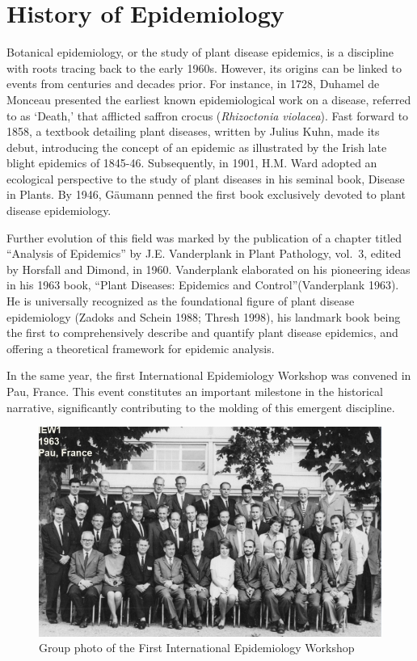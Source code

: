 \documentclass[
  letterpaper,
]{book}
\begin{document}
\hypertarget{history-of-epidemiology}{%
\section{History of Epidemiology}\label{history-of-epidemiology}}

Botanical epidemiology, or the study of plant disease epidemics, is a
discipline with roots tracing back to the early 1960s. However, its
origins can be linked to events from centuries and decades prior. For
instance, in 1728, Duhamel de Monceau presented the earliest known
epidemiological work on a disease, referred to as `Death,' that
afflicted saffron crocus (\emph{Rhizoctonia violacea}). Fast forward to
1858, a textbook detailing plant diseases, written by Julius Kuhn, made
its debut, introducing the concept of an epidemic as illustrated by the
Irish late blight epidemics of 1845-46. Subsequently, in 1901, H.M. Ward
adopted an ecological perspective to the study of plant diseases in his
seminal book, Disease in Plants. By 1946, Gäumann penned the first book
exclusively devoted to plant disease epidemiology.

Further evolution of this field was marked by the publication of a
chapter titled ``Analysis of Epidemics'' by J.E. Vanderplank in Plant
Pathology, vol.~3, edited by Horsfall and Dimond, in 1960. Vanderplank
elaborated on his pioneering ideas in his 1963 book, ``Plant Diseases:
Epidemics and Control''(Vanderplank 1963). He is universally recognized
as the foundational figure of plant disease epidemiology (Zadoks and
Schein 1988; Thresh 1998), his landmark book being the first to
comprehensively describe and quantify plant disease epidemics, and
offering a theoretical framework for epidemic analysis.

In the same year, the first International Epidemiology Workshop was
convened in Pau, France. This event constitutes an important milestone
in the historical narrative, significantly contributing to the molding
of this emergent discipline.

\begin{figure}

{\centering \includegraphics[width=5.38542in,height=\textheight]{imgs/iew1.png}

}

\caption{\label{fig-iew1}Group photo of the First International
Epidemiology Workshop}

\end{figure}
\end{document}
